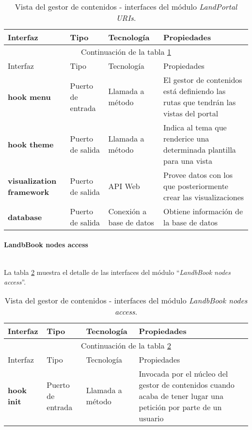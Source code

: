 \begin{longtable}[c]{|p{25mm}|p{20mm}|p{30mm}|p{60mm}|}
	\caption{Vista del gestor de contenidos - interfaces del módulo \textit{LandPortal URIs}. \label{interfaces_cms_landportal_uris}}\\
		\hline
			Interfaz & Tipo & Tecnología & Propiedades\\
		\hline
		\hline
	\endfirsthead
		\hline
		\multicolumn{4}{|c|}{Continuación de la tabla \ref{interfaces_cms_landportal_uris}}\\
		\hline
			Interfaz & Tipo & Tecnología & Propiedades\\
		\hline
		\hline
	\endhead
	\hline
	\endfoot
		\textbf{hook menu} & Puerto de entrada & Llamada a método & El gestor de contenidos está definiendo las rutas que tendrán las vistas del portal \\
		\hline
		\textbf{hook theme} & Puerto de salida & Llamada a método & Indica al tema que renderice una determinada plantilla para una vista \\
		\hline
		\textbf{visualization framework} & Puerto de salida & API Web & Provee datos con los que posteriormente crear las visualizaciones \\
		\hline
		\textbf{database} & Puerto de salida & Conexión a base de datos & Obtiene información de la base de datos \\
	\hline
	\hline
\end{longtable}


\paragraph{LandbBook nodes access} \hfill \\
La tabla \ref{interfaces_cms_landbook_nodes_access} muestra el detalle de las interfaces del módulo ``\textit{LandbBook nodes access}''.  

\begin{longtable}[c]{|p{25mm}|p{20mm}|p{30mm}|p{60mm}|}
	\caption{Vista del gestor de contenidos - interfaces del módulo \textit{LandbBook nodes access}. \label{interfaces_cms_landbook_nodes_access}}\\
		\hline
			Interfaz & Tipo & Tecnología & Propiedades\\
		\hline
		\hline
	\endfirsthead
		\hline
		\multicolumn{4}{|c|}{Continuación de la tabla \ref{interfaces_cms_landbook_nodes_access}}\\
		\hline
			Interfaz & Tipo & Tecnología & Propiedades\\
		\hline
		\hline
	\endhead
	\hline
	\endfoot
		\textbf{hook init} & Puerto de entrada & Llamada a método & Invocada por el núcleo del gestor de contenidos cuando acaba de tener lugar una petición por parte de un usuario \\
	\hline
	\hline
\end{longtable}


